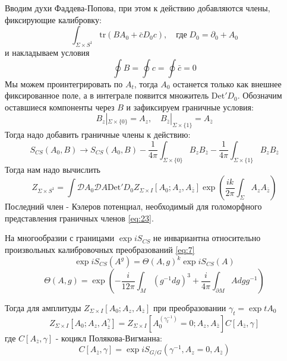 \documentclass[a4paper,12pt]{article}
\theoremstyle{definition} \newtheorem{Def}{Definition}
\begin{document}
Вводим духи Фаддева-Попова, при этом к действию добавляются члены, фиксирующие калибровку:
\begin{equation}
  \label{eq:20}
  \int_{\Sigma\times S^1}\mathrm{tr}(BA_0+\bar{c}D_0c),\quad \mbox{где} \; D_0=\partial_0+A_0
\end{equation}
и накладываем условия
\begin{equation}
  \label{eq:21}
  \oint B=\oint c=\oint \bar{c}=0
\end{equation}
Мы можем проинтегрировать по $A_t$, тогда $A_0$ останется только как внешнее фиксированное поле, а в интеграле появится множитель $\mathrm{Det}'D_0$. Обозначим оставшиеся компоненты через $B$ и зафиксируем граничные условия:
\begin{equation}
  \label{eq:22}
  B_z|_{\Sigma\times \{0\}}=A_z,\quad B_{\bar{z}}|_{\Sigma\times\{1\}}=A_{\bar z}
\end{equation}
Тогда надо добавить граничные члены к действию:
\begin{equation}
  \label{eq:23}
  S_{CS}(A_0,B)\to S_{CS}(A_0,B)-\frac{1}{4\pi}\int_{\Sigma\times \{0\}}B_z B_{\bar z}-\frac{1}{4\pi}\int_{\Sigma\times \{1\}}B_z B_{\bar z}
\end{equation}
Тогда нам надо вычислить
\begin{equation}
  \label{eq:24}
  Z_{\Sigma\times S^1}=\int \mathcal{D}A_0\mathcal{D}A \mathrm{Det}'D_0 Z_{\Sigma\times I}[A_0; A_z, A_{\bar z}]\exp\left(\frac{ik}{2\pi}\int_{\Sigma}A_z A_{\bar z}\right)
\end{equation}
Последний член - Кэлеров потенциал, необходимый для голоморфного представления граничных членов \eqref{eq:23}.

На многообразии с границами $\exp iS_{CS}$ не инвариантна относительно произвольных калибровочных преобразований \eqref{eq:7}
\begin{equation}
  \label{eq:25}
  \exp iS_{CS}(A^g)=\Theta(A,g)^k \exp iS_{CS}(A)
\end{equation}
\begin{equation}
  \label{eq:26}
  \Theta(A,g)=\exp \left(-\frac{i}{12\pi}\int_M(g^{-1}dg)^3+\frac{i}{4\pi}\int_{\partial M} A dg g^{-1}\right)
\end{equation}

Тогда для амплитуды $Z_{\Sigma\times I}[A_0;A_z,A_{\bar z}]$ при преобразовании $\gamma_t=\exp tA_0$
\begin{equation}
  \label{eq:27}
  Z_{\Sigma\times I}[A_0;A_z,A_{\bar z}^{\gamma}]=Z_{\Sigma\times I}[A_0^{(\gamma_t^{-1})}=0;A_z,A_{\bar z}] C[A_{\bar z},\gamma]
\end{equation}
где $C[A_{\bar z},\gamma]$ - коцикл Полякова-Вигманна:
\begin{equation}
  \label{eq:28}
  C[A_{\bar z},\gamma]=\exp iS_{G/G}(\gamma^{-1},A_z=0,A_{\bar z})
\end{equation}
\end{document}
